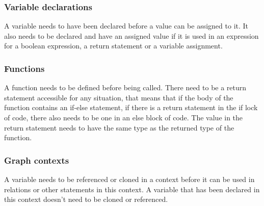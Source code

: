 \subsubsection*{Variable declarations}

A variable needs to have been declared before a value can be assigned to it.
It also needs to be declared and have an assigned value if it is used in an expression for a boolean expression, a return statement or a variable assignment.

\subsubsection*{Functions}

A function needs to be defined before being called.
There need to be a return statement accessible for any situation, that means that if the body of the function contains an if-else statement, if there is a return statement in the if lock of code, there also needs to be one in an else block of code.
The value in the return statement needs to have the same type as the returned type of the function. %

\subsubsection*{Graph contexts}

A variable needs to be referenced or cloned in a context before it can be used in relations or other statements in this context.
A variable that has been declared in this context doesn't need to be cloned or referenced.